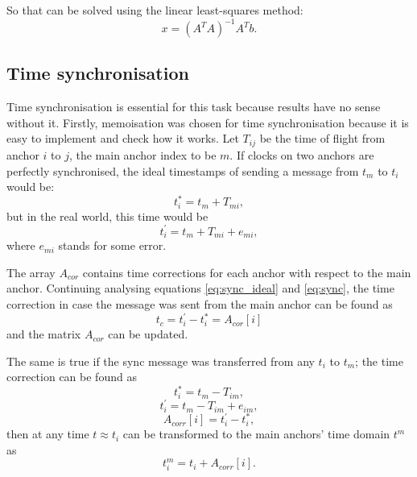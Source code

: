\documentclass[journal]{IEEEtran}
\begin{document}
So that can be solved using the linear least-squares method:
\begin{equation}
    x = (A^{T}A)^{-1}A^{T}b.
\end{equation}

\subsection{Time synchronisation}
\label{sec:time_sync}

Time synchronisation is essential for this task because results have no sense without it.
Firstly, memoisation was chosen for time synchronisation because it is easy to implement and check how it works.
Let $T_{ij}$ be the time of flight from anchor $i$ to $j$, the main anchor index to be $m$.
If clocks on two anchors are perfectly synchronised, the ideal timestamps of sending a message from $t_m$ to $t_i$ would be:
\begin{equation}
    \label{eq:sync_ideal}
    t_{i}^* = t_m + T_{mi},
\end{equation}
but in the real world, this time would be
\begin{equation}
    \label{eq:sync}
    t_{i}^{'} = t_m + T_{mi} + e_{mi},
\end{equation}
where $e_{mi}$ stands for some error.

The array $A_{cor}$ contains time corrections for each anchor with respect to the main anchor. 
Continuing analysing equations \eqref{eq:sync_ideal} and \eqref{eq:sync}, the time correction in case the message was sent from the main anchor can be found as
\begin{equation}
    t_{c} = t_i^{'} - t_i^{*} = A_{cor}[i]
\end{equation}
and the matrix $A_{cor}$ can be updated.

The same is true if the sync message was transferred from any $t_i$ to $t_m$; the time correction can be found as
\begin{equation}
    t_i^{*} = t_m - T_{im},
\end{equation}
\begin{equation}
    t_i^{'} = t_m - T_{im} + e_{im},
\end{equation}
\begin{equation}
    A_{corr}[i] = t_i^{'} - t_i^{*},
\end{equation}
then at any time $t \approx t_i$ can be transformed to the main anchors' time domain $t^m$ as
\begin{equation}
    t_i^{m} = t_i + A_{corr}[i].
\end{equation}
\end{document}
